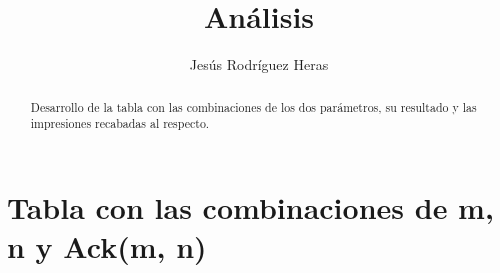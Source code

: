 \documentclass[12pt,letterpaper]{article}
\title{Análisis}
\author{Jesús Rodríguez Heras}
\begin{document}
	
	\maketitle
	\begin{abstract} %
		\begin{center}
			Desarrollo de la tabla con las combinaciones de los dos parámetros, su resultado y las impresiones recabadas al respecto.
		\end{center}
	\end{abstract}
	\thispagestyle{empty}
	\newpage
	
	\tableofcontents
	\newpage
	
	
	
	
	\lstset{language=bash, numbers=left, numberstyle=\tiny, numbersep=10pt, firstnumber=1, stepnumber=1, basicstyle=\small\ttfamily, tabsize=1, extendedchars=true, inputencoding=latin1}


\section{Tabla con las combinaciones de m, n y Ack(m, n)}
\end{document}
